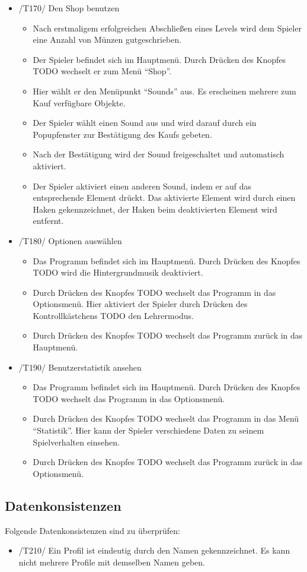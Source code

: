 \begin{itemize}
\item /T170/ Den Shop benutzen
\begin{itemize}
\item Nach erstmaligem erfolgreichen Abschließen eines Levels wird dem Spieler eine Anzahl von Münzen gutgeschrieben.
\item Der Spieler befindet sich im Hauptmenü. Durch Drücken des Knopfes TODO wechselt er zum Menü "`Shop"'.
\item Hier wählt er den Menüpunkt "`Sounds"' aus. Es erscheinen mehrere zum Kauf verfügbare Objekte.
\item Der Spieler wählt einen Sound aus und wird darauf durch ein Popupfenster zur Bestätigung des Kaufs gebeten.
\item Nach der Bestätigung wird der Sound freigeschaltet und automatisch aktiviert.
\item Der Spieler aktiviert einen anderen Sound, indem er auf das entsprechende Element drückt. Das aktivierte Element wird durch einen Haken gekennzeichnet, der Haken beim deaktivierten Element wird entfernt.
\end{itemize}

\item /T180/ Optionen auswählen
\begin{itemize}
\item Das Programm befindet sich im Hauptmenü. Durch Drücken des Knopfes TODO wird die Hintergrundmusik deaktiviert.
\item Durch Drücken des Knopfes TODO wechselt das Programm in das Optionsmenü. Hier aktiviert der Spieler durch Drücken des Kontrollkästchens TODO den Lehrermodus.
\item Durch Drücken des Knopfes TODO wechselt das Programm zurück in das Hauptmenü.
\end{itemize}

\item /T190/ Benutzerstatistik ansehen
\begin{itemize}
\item Das Programm befindet sich im Hauptmenü. Durch Drücken des Knopfes TODO wechselt das Programm in das Optionsmenü.
\item Durch Drücken des Knopfes TODO wechselt das Programm in das Menü "`Statistik"'. Hier kann der Spieler verschiedene Daten zu seinem Spielverhalten einsehen.
\item Durch Drücken des Knopfes TODO wechselt das Programm zurück in das Optionsmenü.
\end{itemize}

\end{itemize}

\subsection{Datenkonsistenzen}
Folgende Datenkonsistenzen sind zu überprüfen:

\begin{itemize}
\item /T210/ Ein Profil ist eindeutig durch den Namen gekennzeichnet. Es kann nicht mehrere Profile mit demselben Namen geben.
\end{itemize}
